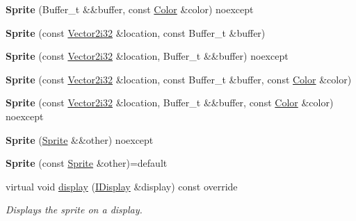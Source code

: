 \begin{DoxyCompactItemize}
{\bfseries Sprite} (Buffer\+\_\+t \&\&buffer, const \hyperlink{structmonsterbattle_1_1Color}{Color} \&color) noexcept
\item 
\mbox{\label{classmonsterbattle_1_1Sprite_a5393724ec56f00d7aea456404016ecef}} 
{\bfseries Sprite} (const \hyperlink{structmonsterbattle_1_1Vector}{Vector2i32} \&location, const Buffer\+\_\+t \&buffer)
\item 
\mbox{\label{classmonsterbattle_1_1Sprite_a4ae9409182f427a18c12b18ca64ca5e9}} 
{\bfseries Sprite} (const \hyperlink{structmonsterbattle_1_1Vector}{Vector2i32} \&location, Buffer\+\_\+t \&\&buffer) noexcept
\item 
\mbox{\label{classmonsterbattle_1_1Sprite_a25455aafc58e6cc48fa1de4088e0c1e2}} 
{\bfseries Sprite} (const \hyperlink{structmonsterbattle_1_1Vector}{Vector2i32} \&location, const Buffer\+\_\+t \&buffer, const \hyperlink{structmonsterbattle_1_1Color}{Color} \&color)
\item 
\mbox{\label{classmonsterbattle_1_1Sprite_a77d29d3145f93cb4be962b60af5e1d88}} 
{\bfseries Sprite} (const \hyperlink{structmonsterbattle_1_1Vector}{Vector2i32} \&location, Buffer\+\_\+t \&\&buffer, const \hyperlink{structmonsterbattle_1_1Color}{Color} \&color) noexcept
\item 
\mbox{\label{classmonsterbattle_1_1Sprite_a933b5e8b970711cfe0cecef0e7cd03a1}} 
{\bfseries Sprite} (\hyperlink{classmonsterbattle_1_1Sprite}{Sprite} \&\&other) noexcept
\item 
\mbox{\label{classmonsterbattle_1_1Sprite_afe7a07a8a304d1e6be5bc53eb73e2f4a}} 
{\bfseries Sprite} (const \hyperlink{classmonsterbattle_1_1Sprite}{Sprite} \&other)=default
\item 
virtual void \hyperlink{classmonsterbattle_1_1Sprite_a9e4c8986170e84e1e92e65d92af4ffee}{display} (\hyperlink{structmonsterbattle_1_1IDisplay}{I\+Display} \&display) const override
\begin{DoxyCompactList}\small\item\em Displays the sprite on a display. \end{DoxyCompactList}\item 

\end{DoxyCompactItemize}
